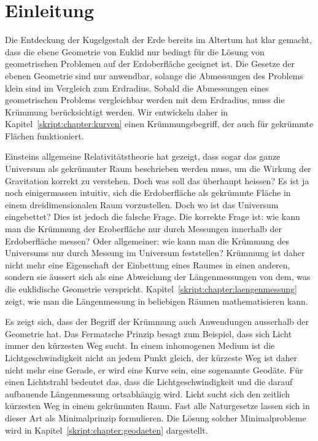 %
%
%
\chapter*{Einleitung\label{chapter:einleitung}}
\rhead{}
Die Entdeckung der Kugelgestalt der Erde bereits im Altertum hat
klar gemacht, dass die ebene Geometrie von Euklid nur bedingt für
die Lösung von geometrischen Problemen auf der Erdoberfläche geeignet
ist.
Die Gesetze der ebenen Geometrie sind nur anwendbar, solange 
die Abmessungen des Problems klein sind im Vergleich zum Erdradius.
Sobald die Abmessungen eines geometrischen Problems vergleichbar werden
mit dem Erdradius, muss die Krümmung berücksichtigt werden.
Wir entwickeln daher in Kapitel~\ref{skript:chapter:kurven}
einen Krümmungsbegriff, der auch für gekrümmte Flächen funktioniert.

Einsteins allgemeine Relativitätstheorie hat gezeigt, dass sogar das
ganze Universum als gekrümmter Raum beschrieben werden muss, um die 
Wirkung der Gravitation korrekt zu verstehen.
Doch was soll das überhaupt heissen?
Es ist ja noch einigermassen intuitiv, sich die Erdoberfläche
als gekrümmte Fläche in einem dreidimensionalen Raum vorzustellen.
Doch wo ist das Universum eingebettet?
Dies ist jedoch die falsche Frage.
Die korrekte Frage ist: wie kann man die Krümmung der Eroberfläche
nur durch Messungen innerhalb der Erdoberfläche messen?
Oder allgemeiner: wie kann man die Krümmung des Universums nur durch
Messung im Universum feststellen?
Krümmung ist daher nicht mehr eine Eigenschaft der Einbettung eines
Raumes in einen anderen, sondern sie äussert sich als eine Abweichung
der Längenmessungen von dem, was die euklidische Geometrie verspricht.
Kapitel~\ref{skript:chapter:laengenmessung} zeigt, wie man die Längenmessung
in beliebigen Räumen mathematisieren kann.

Es zeigt sich, dass der Begriff der Krümmung auch Anwendungen ausserhalb
der Geometrie hat.
Das Fermatsche Prinzip besagt zum Beispiel, dass sich Licht immer
den kürzesten Weg sucht.
In einem inhomogenen Medium ist die Lichtgeschwindigkeit nicht
an jedem Punkt gleich, der kürzeste Weg ist daher nicht mehr eine
Gerade, er wird eine Kurve sein, eine sogenannte Geodäte.
Für einen Lichtstrahl bedeutet das, dass die Lichtgeschwindigkeit und
die darauf aufbauende Längenmessung ortsabhängig wird.
Licht sucht sich den zeitlich kürzesten Weg in einem gekrümmten Raum.
Fast alle Naturgesetze lassen sich in dieser Art als Minimalprinzip
formulieren.
Die Lösung solcher Minimalprobleme wird in
Kapitel~\ref{skript:chapter:geodaeten} dargestellt.

